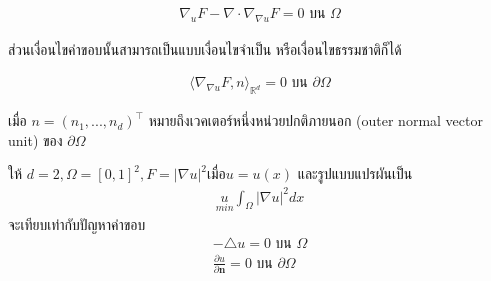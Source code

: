 \begin{align*}
    \nabla_u F - \nabla \cdot \nabla_{\nabla u} F = 0 \text{ บน } \Omega
\end{align*}

ส่วนเงื่อนไขค่าขอบนั้นสามารถเป็นแบบเงื่อนไขจำเป็น หรือเงื่อนไขธรรมชาติก็ได้

\begin{align*}
    \langle \nabla_{\nabla u} F, n \rangle_{\mathbb{R}^{d}} = 0 \text{ บน } \partial \Omega
\end{align*}

เมื่อ $n = (n_1, ..., n_d)^\top$ หมายถึงเวคเตอร์หนึ่งหน่วยปกติภายนอก (outer normal vector unit) ของ $\partial \Omega$

\begin{Example}
    ให้ $d = 2, \Omega = [0,1]^2, F = |\nabla u|^2 \text{เมื่อ} u = u(x)$ และรูปแบบแปรผันเป็น 
    \begin{align*}
        \underset{min}{u} \int_{\Omega} |\nabla u|^2 dx 
    \end{align*}
    จะเทียบเท่ากับปัญหาค่าขอบ
    \begin{align*}
        - \triangle u = 0 \text{ บน } \Omega \\
        \frac{ \partial  u }{ \partial \boldsymbol{n}} = 0 \text{ บน } \partial \Omega
    \end{align*}
\end{Example}